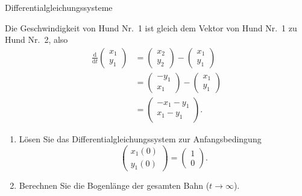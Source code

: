 \begin{ueb}{Differentialgleichungssysteme}{}
\begin{enumerate}
              Die Geschwindigkeit von Hund Nr.~1 ist gleich dem Vektor
              von Hund Nr.~1 zu Hund Nr.~2, also
              \[
                  \begin{aligned}
                      \frac{\mathrm{d}}{\mathrm{d}t}
                      \begin{pmatrix}x_1\\y_1\end{pmatrix}
                       & =
                      \begin{pmatrix}x_2\\y_2\end{pmatrix}
                      -
                      \begin{pmatrix}x_1\\y_1\end{pmatrix} \\
                       & =
                      \begin{pmatrix}-y_1\\x_1\end{pmatrix}
                      -
                      \begin{pmatrix}x_1\\y_1\end{pmatrix} \\
                       & =
                      \begin{pmatrix}
                          -x_1-y_1 \\
                          x_1-y_1
                      \end{pmatrix}.
                  \end{aligned}
              \]

              \begin{enumerate}
                  \item Lösen Sie das Differentialgleichungssystem
                        zur Anfangsbedingung
                        \[
                            \begin{pmatrix}
                                x_1(0) \\y_1(0)
                            \end{pmatrix}
                            =
                            \begin{pmatrix}1\\0\end{pmatrix}.
                        \]

                  \item Berechnen Sie die Bogenlänge der gesamten Bahn
                        (\(t\to\infty\)).
              \end{enumerate}


\end{enumerate}
\end{ueb}

